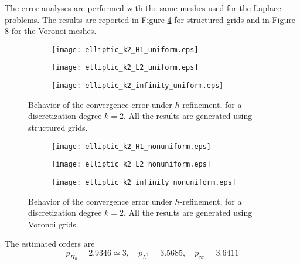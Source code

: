 \documentclass[10pt]{article}
\begin{document}
The error analyses are performed with the same meshes used for the Laplace problems. The results are reported in Figure \ref{fig:ell_k2_uniform} for structured grids and in Figure \ref{fig:ell_k2_nonuniform} for the Voronoi meshes.
\begin{figure}[H]
	\centering
	\begin{subfigure}{0.32\textwidth}
		\centering
		\texttt{[image: elliptic\_k2\_H1\_uniform.eps]}
		\label{fig:ell_k2_H1_uniform}
	\end{subfigure}
	\begin{subfigure}{0.32\textwidth}
		\centering
		\texttt{[image: elliptic\_k2\_L2\_uniform.eps]}
		\label{fig:ell_k2_L2_uniform}
	\end{subfigure}
	\begin{subfigure}{0.32\textwidth}
		\centering
		\texttt{[image: elliptic\_k2\_infinity\_uniform.eps]}
		\label{fig:ell_k2_infinity_uniform}
	\end{subfigure}
	\caption{Behavior of the convergence error under $h$-refinement, for a discretization degree $k=2$. All the results are generated using structured grids.}
	\label{fig:ell_k2_uniform}
\end{figure}
\begin{figure}[H]
	\centering
	\begin{subfigure}{0.32\textwidth}
		\centering
		\texttt{[image: elliptic\_k2\_H1\_nonuniform.eps]}
		\label{fig:ell_k2_H1_nonuniform}
	\end{subfigure}
	\begin{subfigure}{0.32\textwidth}
		\centering
		\texttt{[image: elliptic\_k2\_L2\_nonuniform.eps]}
		\label{fig:ell_k2_L2_nonuniform}
	\end{subfigure}
	\begin{subfigure}{0.32\textwidth}
		\centering
		\texttt{[image: elliptic\_k2\_infinity\_nonuniform.eps]}
		\label{fig:ell_k2_infinity_nonuniform}
	\end{subfigure}
	\caption{Behavior of the convergence error under $h$-refinement, for a discretization degree $k=2$. All the results are generated using Voronoi grids.}
	\label{fig:ell_k2_nonuniform}
\end{figure}
The estimated orders are
$$p_{H^1_0}=2.9346\simeq3, \quad p_{L^2}=3.5685, \quad p_\infty=3.6411$$
\end{document}
